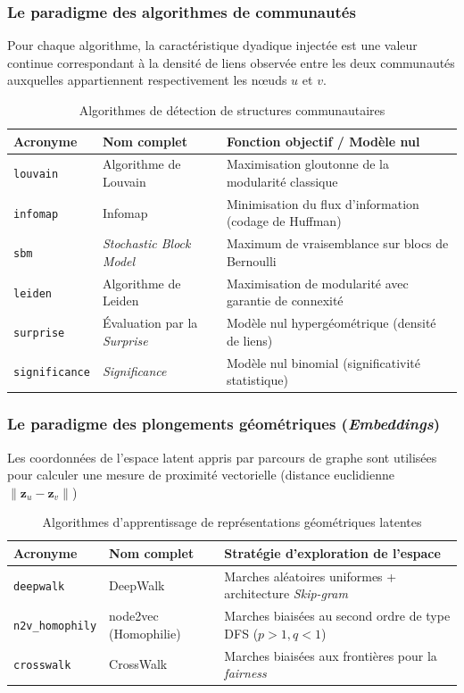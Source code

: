 \subsubsection{Le paradigme des algorithmes de communautés}

Pour chaque algorithme, la caractéristique dyadique injectée est une valeur continue correspondant à la densité de liens observée entre les deux communautés auxquelles appartiennent respectivement les nœuds $u$ et $v$.

\begin{table}[h]
\centering
\caption{Algorithmes de détection de structures communautaires}
\label{tab:metriques_commu}
\begin{tabular}{lll}
\hline
\textbf{Acronyme} & \textbf{Nom complet} & \textbf{Fonction objectif / Modèle nul} \\
\hline
\texttt{louvain} & Algorithme de Louvain & Maximisation gloutonne de la modularité classique \\
\texttt{infomap} & Infomap & Minimisation du flux d'information (codage de Huffman) \\
\texttt{sbm} & \textit{Stochastic Block Model} & Maximum de vraisemblance sur blocs de Bernoulli \\
\texttt{leiden} & Algorithme de Leiden & Maximisation de modularité avec garantie de connexité \\
\texttt{surprise} & Évaluation par la \textit{Surprise} & Modèle nul hypergéométrique (densité de liens) \\
\texttt{significance} & \textit{Significance} & Modèle nul binomial (significativité statistique) \\
\hline
\end{tabular}
\end{table}

\subsubsection{Le paradigme des plongements géométriques (\textit{Embeddings})}

Les coordonnées de l'espace latent appris par parcours de graphe sont utilisées pour calculer une mesure de proximité vectorielle (distance euclidienne $\|\mathbf{z}_u - \mathbf{z}_v\|$)

\begin{table}[h]
\centering
\caption{Algorithmes d'apprentissage de représentations géométriques latentes}
\label{tab:metriques_embed}
\begin{tabular}{lll}
\hline
\textbf{Acronyme} & \textbf{Nom complet} & \textbf{Stratégie d'exploration de l'espace} \\
\hline
\texttt{deepwalk} & DeepWalk & Marches aléatoires uniformes + architecture \textit{Skip-gram} \\
\texttt{n2v\_homophily} & node2vec (Homophilie) & Marches biaisées au second ordre de type DFS ($p>1, q<1$) \\
\texttt{crosswalk} & CrossWalk & Marches biaisées aux frontières pour la \textit{fairness} \\
\hline
\end{tabular}
\end{table}


